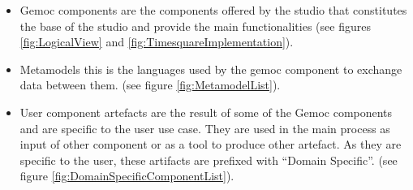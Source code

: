 \documentclass{gemoc} %
\begin{document}
\begin{itemize}
	\item Gemoc components are the components offered by the studio that constitutes the base of the studio and provide the main functionalities (see figures \ref{fig:LogicalView} and \ref{fig:TimesquareImplementation}).
	\item Metamodels this is the languages used by the gemoc component to exchange data between them. (see figure \ref{fig:MetamodelList}).
	\item User component artefacts are the result of some of the Gemoc components and are specific to the user use case. They are used in the main process as input of other component or as a tool to produce other artefact. As they are specific to the user, these artifacts are prefixed with ``Domain Specific''. (see figure \ref{fig:DomainSpecificComponentList}).
\end{itemize}
\end{document}
